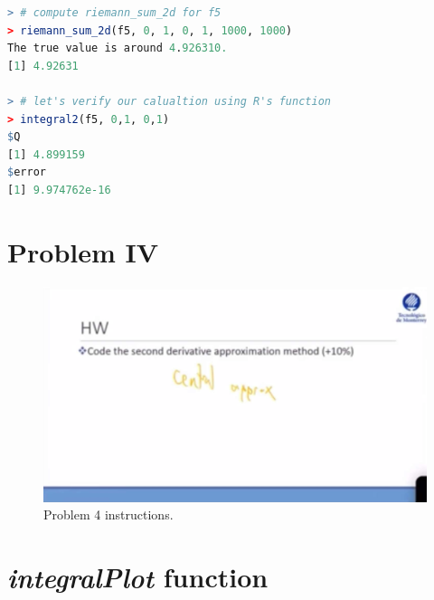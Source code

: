 \documentclass[11pt,a4paper]{article}
\begin{document}
\clearpage

\begin{lstlisting}[frame=trBL, language=R, caption="Listing \ref{lst:rriemann2DFunct5} output"
\label{lst:rriemann2DFunct5_out}]
> # compute riemann_sum_2d for f5
> riemann_sum_2d(f5, 0, 1, 0, 1, 1000, 1000)
The true value is around 4.926310.
[1] 4.92631

> # let's verify our calualtion using R's function
> integral2(f5, 0,1, 0,1)
$Q
[1] 4.899159
$error
[1] 9.974762e-16
\end{lstlisting}

\clearpage

\section{Problem IV}\label{sec:p4}

\begin{figure}[!h]
\centering
\includegraphics[width=\textwidth]{./img/instructionsP4.jpg}
\caption{Problem 4 instructions.\label{fig:P4inst}}
\end{figure}


\clearpage
\printbibliography

\appendix %

\clearpage

\section{\emph{integralPlot} function}\label{sec:appends}
\end{document}
